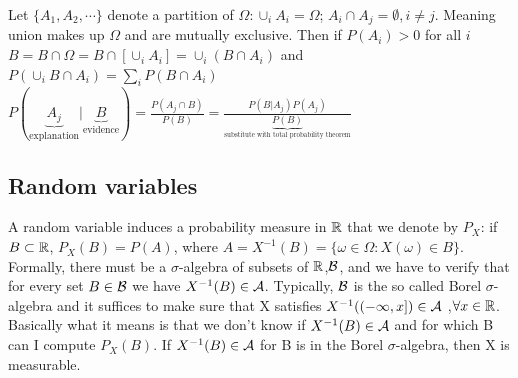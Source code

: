 \bigskip

Let $\{A_1, A_2,\cdots\}$ denote a partition of $\Omega: \cup_i A_i = \Omega$; $A_i\cap A_j = \emptyset, i\neq j$.
Meaning union makes up $\Omega$ and are mutually exclusive. Then if $P(A_i)>0$ for all $i$
$B = B\cap \Omega = B\cap [\cup_i A_i] = \cup_i (B\cap A_i)$ and $P(\cup_i B\cap A_i) = \sum_i P(B\cap A_i)$
$\displaystyle P(\underbrace{A_j}_{\text{explanation}}|\underbrace{B}_{\text{evidence}}) = \frac{P(A_j \cap B)}{P(B)} = \frac{P(B|A_j)P(A_j)}{\underbrace{P(B)}_{\text{substitute with total probability theorem}}}$

\subsection{Random variables}
A random variable induces a probability measure in $\mathbb{R}$ that we denote by $P_X$: if $B\subset\mathbb{R}$,
$P_X(B) = P(A)$, where $A = X^{-1}(B) = \{\omega\in\Omega: X(\omega)\in B\}$.
Formally, there must be a $\sigma$-algebra of subsets of $\mathbb{R}$,$\mathcal{B}$, and we have to verify that for every set $B\in\mathcal{B}$ we have $X^{-1}(B)\in\mathcal{A}$.
Typically, $\mathcal{B}$ is the so called Borel $\sigma$-algebra and it suffices to make sure that X satisfies $X^{-1}((-\infty,x])\in\mathcal{A}$ ,$\forall x\in\mathbb{R}$.
\\

Basically what it means is that we don't know if $X^{-1}(B)\in\mathcal{A}$ and for which B can I compute $P_X(B)$.
If $X^{-1}(B)\in\mathcal{A}$ for B is in the Borel $\sigma$-algebra, then X is measurable.


